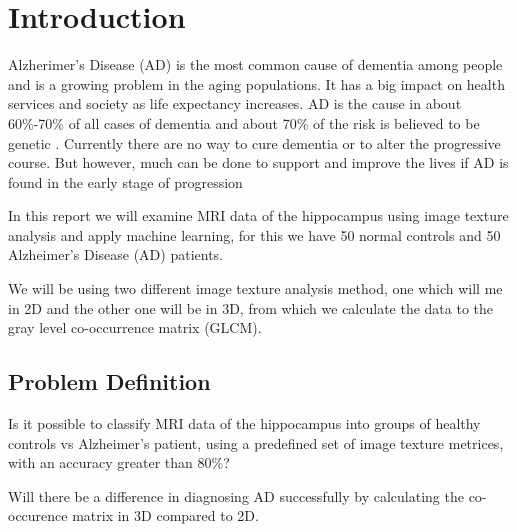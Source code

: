 \chapter{Introduction}

Alzherimer's Disease (AD) is the most common cause of dementia among people and is a growing problem in the aging populations. It has a big impact on health services and society as life expectancy increases. AD is the cause in about 60\%-70\% of all cases of dementia\cite{Who} and about 70\% of the risk is believed to be genetic \cite{AlzheimerLancet}. Currently there are no way to cure dementia or to alter the progressive course. But however, much can be done to support and improve the lives if AD is found in the early stage of progression \cite{Who}

In this report we will examine MRI data of the hippocampus using image texture analysis and apply machine learning, for this we have 50 normal controls and 50 Alzheimer's Disease (AD) patients. 

We will be using two different image texture analysis method, one which will me in 2D\cite{MRfreeborough}\cite{Castellano} and the other one will be in 3D\cite{Voxel}, from which we calculate the data to the gray level co-occ\-urren\-ce matrix (GLCM).



\section{Problem Definition}

Is it possible to classify MRI data of the hippocampus into groups of healthy controls vs Alzheimer's patient, using a predefined set of image texture metrices, with an accuracy great\-er than 80\%?

Will there be a difference in diagnosing AD successfully by calculating the co-occurence matrix in 3D compared to 2D.








